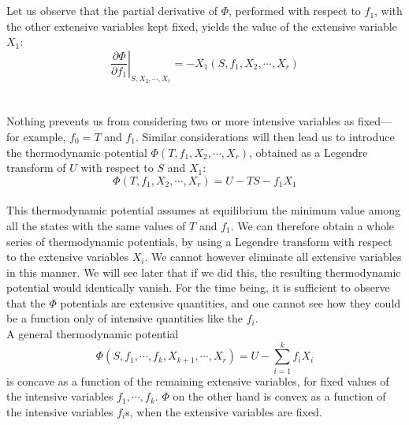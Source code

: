 \\ \\
Let us observe that the partial derivative of $\Phi$, performed with respect to $f_1$, with the other extensive variables kept fixed, yields the value of the extensive variable $X_1$:
\[ \left. \frac{\partial \Phi}{\partial f_1} \right|_{S,X_2,\cdots,X_r} = -X_1(S,f_1,X_2,\cdots,X_r)\]
\\ \\
Nothing prevents us from considering two or more intensive variables as fixed—for example, $f_0 = T$ and $f_1$. Similar considerations will then lead us to introduce the thermodynamic potential $\Phi(T,f_1,X_2,\cdots,X_r)$, obtained as a Legendre transform of $U$ with respect to $S$ and $X_1$:
\[\Phi(T,f_1,X_2,\cdots,X_r) = U - TS - f_1X_1\]
\\
This thermodynamic potential assumes at equilibrium the minimum value among all the states with the same values of $T$ and $f_1$. We can therefore obtain a whole series of thermodynamic potentials, by using a Legendre transform with respect to the extensive variables $X_i$. We cannot however eliminate all extensive variables in this manner. We will see later that if we did this, the resulting thermodynamic potential would identically vanish. For the time being, it is sufficient to observe that the $\Phi$ potentials are extensive quantities, and one cannot see how they could be a function only of intensive quantities like the $f_i$.
\\
A general thermodynamic potential
\[\Phi(S,f_1,\cdots,f_k,X_{k+1},\cdots,X_r) = U - \sum_{i = 1}^{k} f_i X_i\]
is concave as a function of the remaining extensive variables, for fixed values of the intensive variables $f_1,\cdots,f_k$.
$\Phi$ on the other hand is convex as a function of the intensive variables $f_i$s, when the extensive variables are fixed.

